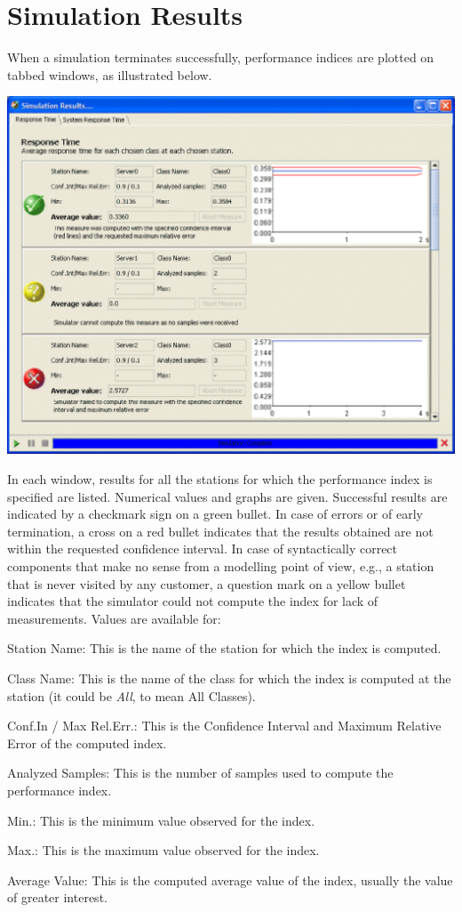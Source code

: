 \section{Simulation Results}
\label{sec:SimulationResults}
When a simulation terminates successfully, performance indices are plotted on tabbed windows, as illustrated below.
\begin{center}
\includegraphics[scale=.5]{img/jsim/sim_window.eps}
\end{center}
In each window, results for all the stations for which the
performance index is specified are listed. Numerical values and
graphs are given. Successful results are indicated by a checkmark
sign on a green bullet. In case of errors or of early termination,
a cross on a red bullet indicates that the results obtained are
not within the requested confidence interval. In case of
syntactically correct components that make no sense from a
modelling point of view, e.g., a station that is never visited by
any customer, a question mark on a yellow bullet indicates that
the simulator could not compute the index for lack of
measurements. Values are available for:
\begin{itemize*}
\item Station Name: This is the name of the station for which the index is computed.
\item Class Name: This is the name of the class for which the index is computed at the station (it could be \emph{All}, to mean All Classes).
\item Conf.In / Max Rel.Err.: This is the Confidence Interval and Maximum Relative Error of the computed index.
\item Analyzed Samples: This is the number of samples used to compute the performance index.
\item Min.: This is the minimum value observed for the index.
\item Max.: This is the maximum value observed for the index.
\item Average Value: This is the computed average value of the index, usually the value of greater interest.
\end{itemize*}


